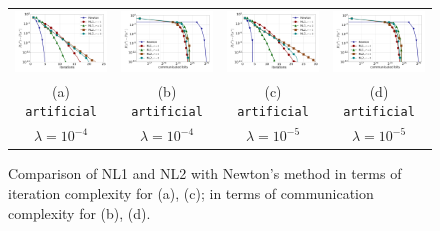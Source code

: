 \documentclass[12pt]{article}
\begin{document}
\begin{figure}[ht]
	\vskip 0.2in
	\begin{center}
		\begin{tabular}{cccc}
			\includegraphics[width = 0.23 \textwidth]{LogReg/artificial/Lambda=1e-4/artificial_nm_nl1_nl2_iter_lmb=0.0001.pdf}&
			\includegraphics[width = 0.23 \textwidth]{LogReg/artificial/Lambda=1e-4/artificial_nm_nl1_nl2_bits_lmb=0.0001.pdf}&	
			\includegraphics[width = 0.23 \textwidth]{LogReg/artificial/Lambda=1e-5/artificial_nm_nl1_nl2_iter_lmb=0.00001.pdf}&
			\includegraphics[width = 0.23 \textwidth]{LogReg/artificial/Lambda=1e-4/artificial_nm_nl1_nl2_bits_lmb=0.0001.pdf}\\
			(a) {\tt artificial} & (b) {\tt artificial} & (c) {\tt artificial} & (d) {\tt artificial}\\
			$\lambda=10^{-4}$ & $\lambda=10^{-4}$ & $\lambda=10^{-5}$ & $\lambda=10^{-5}$\\
		\end{tabular}
		\caption{Comparison of {\sf NL1} and {\sf NL2} with Newton's method in terms of iteration complexity for (a), (c); in terms of communication complexity for (b), (d).}
		\label{a9a:alg1_alg2}
	\end{center}
\end{figure}
\end{document}
